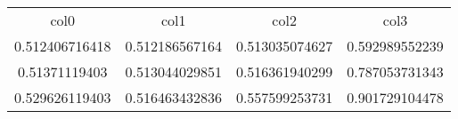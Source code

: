 \begin{table}
\begin{tabular}{cccc}
col0 & col1 & col2 & col3 \\
0.512406716418 & 0.512186567164 & 0.513035074627 & 0.592989552239 \\
0.51371119403 & 0.513044029851 & 0.516361940299 & 0.787053731343 \\
0.529626119403 & 0.516463432836 & 0.557599253731 & 0.901729104478 \\
\end{tabular}
\end{table}
